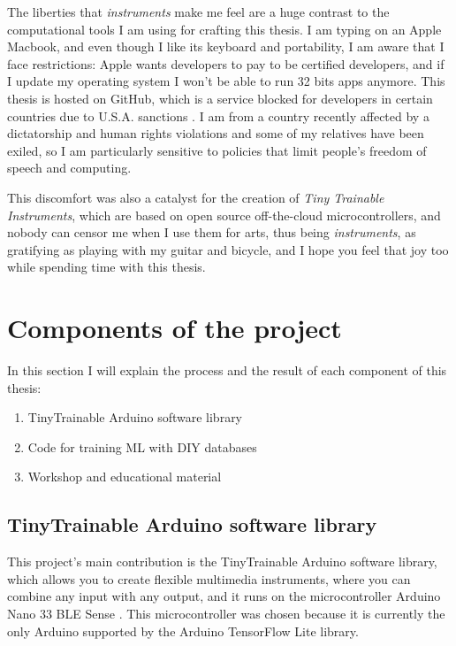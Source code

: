 The liberties that \emph{instruments} make me feel are a huge contrast to the computational tools I am using for crafting this thesis. I am typing on an Apple Macbook, and even though I like its keyboard and portability, I am aware that I face restrictions: Apple wants developers to pay to be certified developers, and if I update my operating system I won't be able to run 32 bits apps anymore. This thesis is hosted on GitHub, which is a service blocked for developers in certain countries due to U.S.A. sanctions \cite{website-github-trade-controls}. I am from a country recently affected by a dictatorship and human rights violations and some of my relatives have been exiled, so I am particularly sensitive to policies that limit people's freedom of speech and computing.

This discomfort was also a catalyst for the creation of \textit{Tiny Trainable Instruments}, which are based on open source off-the-cloud microcontrollers, and nobody can censor me when I use them for arts, thus being \emph{instruments}, as gratifying as playing with my guitar and bicycle, and I hope you feel that joy too while spending time with this thesis.

\section{Components of the project}

In this section I will explain the process and the result of each component of this thesis:

\begin{enumerate}
  \item TinyTrainable Arduino software library
  \item Code for training \acrshort{ML} with \acrshort{DIY} databases
  \item Workshop and educational material
\end{enumerate}

\subsection{TinyTrainable Arduino software library}

This project's main contribution is the TinyTrainable Arduino software library, which allows you to create flexible multimedia instruments, where you can combine any input with any output, and it runs on the microcontroller Arduino Nano 33 BLE Sense \cite{website-materials-arduino-nano-33-ble-sense}. This microcontroller was chosen because it is currently the only Arduino supported by the Arduino TensorFlow Lite library.

